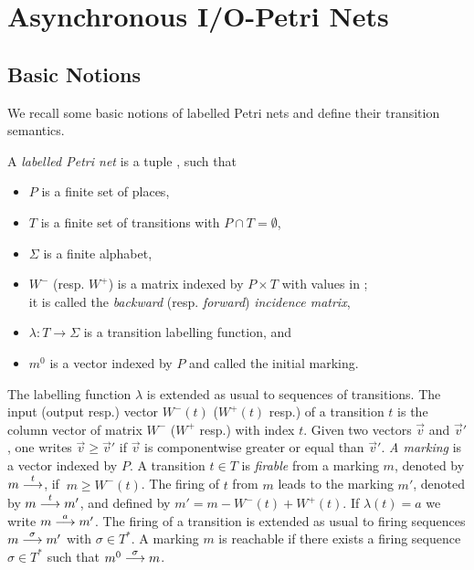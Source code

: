 
\section{Asynchronous I/O-Petri Nets}
\label{sec:AIOPN}

\subsection{Basic Notions}\label{subsec:basics}
We recall some basic notions of labelled Petri nets and define their transition semantics. 

\begin{definition}
A \emph{labelled Petri net} is a tuple \pndef, such that
\begin{itemize}
    \item $P$ is a finite set of places,
    \item $T$ is a finite set of transitions with $P \cap T = \emptyset$,
    \item $\Sigma$ is a finite alphabet,
    \item $W^-$ (resp. $W^+$) is a matrix indexed by $P\times T$ with values in \N;\\ it is called the \emph{backward} (resp. \emph{forward}) \emph{incidence matrix},
    \item $\lambda : T \rightarrow \Sigma$ is a transition labelling function, and
    \item $m^0$ is a vector indexed by $P$ and called the initial marking.
\end{itemize}     
\end{definition}


The labelling 
function $\lambda$ is extended as usual to sequences of transitions. 
The input (output resp.) vector $W^{-}(t)$ ($W^{+}(t)$ resp.) of a transition $t$ is the column
vector of matrix $W^{-}$ ($W^{+}$ resp.) with index $t$.
Given two vectors $\overrightarrow{v}$ and $\overrightarrow{v}'$, one writes $\overrightarrow{v}\geq \overrightarrow{v}'$
if  $\overrightarrow{v}$ is componentwise greater or equal than $\overrightarrow{v}'$.
\emph{A marking} is a vector indexed by $P$.
A transition $t \in T$ is \emph{firable} 
from a marking $m$, denoted by $m \stackrel{t}{\longrightarrow}$, if
$\ m \geq W^{-}(t)$. The firing of $t$ 
from $m$ leads to the marking $m'$, denoted by $m \stackrel{t}{\longrightarrow} m'$, and defined 
by $m' = m - W^{-}(t) + W^{+}(t)$. If $\lambda (t) = a$ we write $m \stackrel{a}{\longrightarrow} m'$.
The firing of a transition is extended as usual to firing sequences $m \stackrel{\sigma}{\longrightarrow} m'$ with $\sigma \in  T^{*}$.
A marking $m$ is reachable if there exists a firing sequence $\sigma \in  T^{*}$ such that  $m^{0} \stackrel{\sigma}{\longrightarrow} m$.

